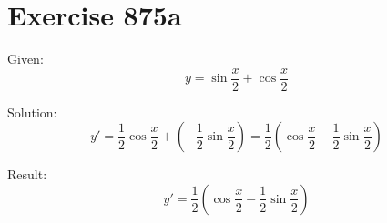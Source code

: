 \documentclass[a4paper, 10pt]{scrartcl}
\begin{document}
\section{Exercise 875a}

Given:
\[
y = \sin{\frac{x}{2}} + \cos{\frac{x}{2}}
\]

Solution:
\[
y' = \frac{1}{2}\cos{\frac{x}{2}} + (-\frac{1}{2}\sin{\frac{x}{2}}) = \frac{1}{2}(\cos{\frac{x}{2}} - \frac{1}{2}\sin{\frac{x}{2}})
\]

Result:
\[
y' = \frac{1}{2}(\cos{\frac{x}{2}} - \frac{1}{2}\sin{\frac{x}{2}})
\]
\end{document}
